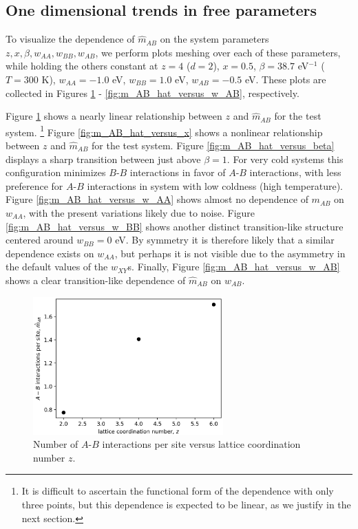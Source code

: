 \documentclass[10pt]{article}
\begin{document}
\subsection{One dimensional trends in free parameters}
To visualize the dependence of $\hat{m}_{AB}$ on the system parameters $z,x,\beta,w_{AA},w_{BB},w_{AB}$, we perform plots meshing over each of these parameters, while holding the others constant at $z=4$ ($d = 2$), $x = 0.5$, $\beta = 38.7$ eV$^{-1}$ ($T = 300$ K), $w_{AA} = -1.0$ eV, $w_{BB} = 1.0$ eV, $w_{AB} = -0.5$ eV.
These plots are collected in Figures \ref{fig:m_AB_hat_versus_z} - \ref{fig:m_AB_hat_versus_w_AB}, respectively.

Figure \ref{fig:m_AB_hat_versus_z} shows a nearly linear relationship between $z$ and $\hat{m}_{AB}$ for the test system. \footnote{It is difficult to ascertain the functional form of the dependence with only three points, but this dependence is expected to be linear, as we justify in the next section.} 
Figure \ref{fig:m_AB_hat_versus_x} shows a nonlinear relationship between $z$ and $\hat{m}_{AB}$ for the test system.
Figure \ref{fig:m_AB_hat_versus_beta} displays a sharp transition between just above $\beta = 1$. For very cold systems this configuration minimizes $B$-$B$ interactions in favor of $A$-$B$ interactions, with less preference for $A$-$B$ interactions in system with low coldness (high temperature).
Figure \ref{fig:m_AB_hat_versus_w_AA} shows almost no dependence of $m_{AB}$ on $w_{AA}$, with the present variations likely due to noise.
Figure \ref{fig:m_AB_hat_versus_w_BB} shows another distinct transition-like structure centered around $w_{BB}=0$ eV.
By symmetry it is therefore likely that a similar dependence exists on $w_{AA}$, but perhaps it is not visible due to the asymmetry in the default values of the $w_{XY}$s.
Finally, Figure \ref{fig:m_AB_hat_versus_w_AB} shows a clear transition-like dependence of $\hat{m}_{AB}$ on $w_{AB}$.

\begin{figure}[h!]
\centering
\includegraphics[width=0.65\textwidth]{Figures/m_AB_hat_versus_z.png}
\caption{Number of $A$-$B$ interactions per site versus lattice coordination number $z$.}
\label{fig:m_AB_hat_versus_z}
\end{figure}
\end{document}
